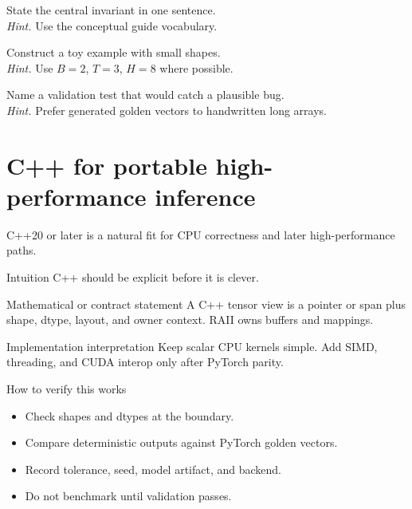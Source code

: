 \begin{chapterexercises}
\item State the central invariant in one sentence.\\
\textit{Hint.} Use the conceptual guide vocabulary.
\item Construct a toy example with small shapes.\\
\textit{Hint.} Use $B=2$, $T=3$, $H=8$ where possible.
\item Name a validation test that would catch a plausible bug.\\
\textit{Hint.} Prefer generated golden vectors to handwritten long arrays.
\end{chapterexercises}

\chapter{C++ for portable high-performance inference}
\label{ch:cpp}
C++20 or later is a natural fit for CPU correctness and later high-performance paths. \citep{cpp2020,cmakeDocs}



\begin{intuitionbox}{Intuition}
C++ should be explicit before it is clever.
\end{intuitionbox}

\begin{definitionbox}{Mathematical or contract statement}
A C++ tensor view is a pointer or span plus shape, dtype, layout, and owner context. RAII owns buffers and mappings.
\end{definitionbox}

\begin{implementationbox}{Implementation interpretation}
Keep scalar CPU kernels simple. Add SIMD, threading, and CUDA interop only after PyTorch parity.
\end{implementationbox}

\begin{verificationbox}{How to verify this works}
\begin{itemize}
\item Check shapes and dtypes at the boundary.
\item Compare deterministic outputs against PyTorch golden vectors.
\item Record tolerance, seed, model artifact, and backend.
\item Do not benchmark until validation passes.
\end{itemize}
\end{verificationbox}

